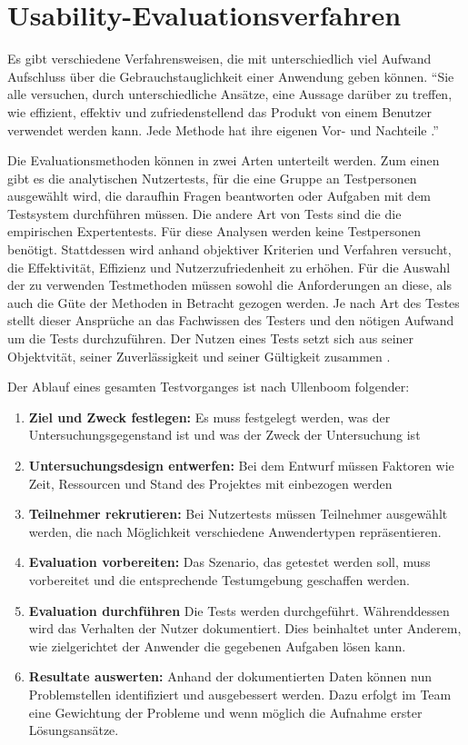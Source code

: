 \section{Usability-Evaluationsverfahren} \label{sec:methods}
Es gibt verschiedene Verfahrensweisen, die mit unterschiedlich viel Aufwand Aufschluss über die Gebrauchstauglichkeit einer Anwendung geben können. \enquote{Sie alle versuchen, durch unterschiedliche Ansätze, eine Aussage darüber zu treffen, wie effizient, effektiv und zufriedenstellend das Produkt von einem Benutzer verwendet werden kann. Jede Methode hat ihre eigenen Vor- und Nachteile \cite[S. 224]{Ullenboom2014}.}\par
Die Evaluationsmethoden können in zwei Arten unterteilt werden. Zum einen gibt es die analytischen Nutzertests, für die eine Gruppe an Testpersonen ausgewählt wird, die daraufhin Fragen beantworten oder Aufgaben mit dem Testsystem durchführen müssen. Die andere Art von Tests sind die die empirischen Expertentests. Für diese Analysen werden keine Testpersonen benötigt. Stattdessen wird anhand objektiver Kriterien und Verfahren versucht, die Effektivität, Effizienz und Nutzerzufriedenheit zu erhöhen. Für die Auswahl der zu verwenden Testmethoden müssen sowohl die Anforderungen an diese, als auch die Güte der Methoden in Betracht gezogen werden. Je nach Art des Testes stellt dieser Ansprüche an das Fachwissen des Testers und den nötigen Aufwand um die Tests durchzuführen. Der Nutzen eines Tests setzt sich aus seiner Objektvität, seiner Zuverlässigkeit und seiner Gültigkeit zusammen \cite[S.224 f.]{Ullenboom2014}.\par
Der Ablauf eines gesamten Testvorganges ist nach Ullenboom folgender:
\begin{enumerate}
	\item \textbf{Ziel und Zweck festlegen:} Es muss festgelegt werden, was der Untersuchungsgegenstand ist und was der Zweck der Untersuchung ist
	\item \textbf{Untersuchungsdesign entwerfen:} Bei dem Entwurf müssen Faktoren wie Zeit, Ressourcen und Stand des Projektes mit einbezogen werden
	\item \textbf{Teilnehmer rekrutieren:} Bei Nutzertests müssen Teilnehmer ausgewählt werden, die nach Möglichkeit verschiedene Anwendertypen repräsentieren.
	\item \textbf{Evaluation vorbereiten:} Das Szenario, das getestet werden soll, muss vorbereitet und die entsprechende Testumgebung geschaffen werden.
	\item \textbf{Evaluation durchführen} Die Tests werden durchgeführt. Währenddessen wird das Verhalten der Nutzer dokumentiert. Dies beinhaltet unter Anderem, wie zielgerichtet der Anwender die gegebenen Aufgaben lösen kann.
	\item \textbf{Resultate auswerten:} Anhand der dokumentierten Daten können nun Problemstellen identifiziert und ausgebessert werden. Dazu erfolgt im Team eine Gewichtung der Probleme und wenn möglich die Aufnahme erster Lösungsansätze.
\end{enumerate}
